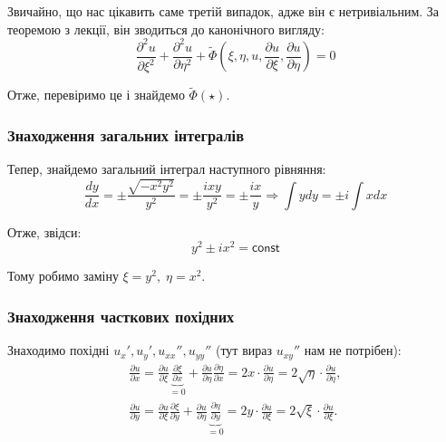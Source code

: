 \documentclass{hw_template}
\begin{document}
Звичайно, що нас цікавить саме третій випадок, адже він є нетривіальним. За теоремою з лекції, він зводиться до канонічного вигляду:
\begin{equation*}
    \frac{\partial^2 u}{\partial \xi^2} + \frac{\partial^2 u}{\partial \eta^2} + \widetilde{\Phi}\left(\xi,\eta,u,\frac{\partial u}{\partial \xi}, \frac{\partial u}{\partial \eta}\right) = 0
\end{equation*}

Отже, перевіримо це і знайдемо $\widetilde{\Phi}(\star)$.

\subsubsection{Знаходження загальних інтегралів}

Тепер, знайдемо загальний інтеграл наступного рівняння:
\begin{equation*}
    \frac{dy}{dx} = \pm\frac{\sqrt{-x^2y^2}}{y^2} = \pm\frac{ixy}{y^2} = \pm\frac{ix}{y} \Rightarrow \int ydy = \pm i \int xdx
\end{equation*}

Отже, звідси:
\begin{equation*}
    y^2 \pm i x^2 = \mathsf{const}
\end{equation*}

Тому робимо заміну $\xi = y^2, \; \eta = x^2$. 

\subsubsection{Знаходження часткових похідних}

Знаходимо похідні $u_x',u_y',u_{xx}'',u_{yy}''$ (тут вираз $u_{xy}''$ нам не потрібен):
\begin{align*}
    \frac{\partial u}{\partial x} = \frac{\partial u}{\partial \xi} \underbrace{\frac{\partial \xi}{\partial x}}_{=0} + \frac{\partial u}{\partial \eta} \frac{\partial \eta}{\partial x} = 2x \cdot \frac{\partial u}{\partial \eta} = \boxed{2\sqrt{\eta} \cdot \frac{\partial u}{\partial \eta}}, \\
    \frac{\partial u}{\partial y} = \frac{\partial u}{\partial \xi} \frac{\partial \xi}{\partial y} + \frac{\partial u}{\partial \eta} \underbrace{\frac{\partial \eta}{\partial y}}_{=0} = 2y \cdot \frac{\partial u}{\partial \xi} = \boxed{2\sqrt{\xi} \cdot \frac{\partial u}{\partial \xi}}.
\end{align*}
\end{document}
